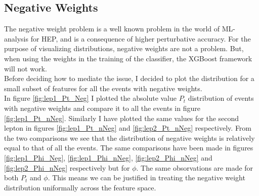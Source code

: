 \subsection{Negative Weights}
The negative weight problem is a well known problem in the world of ML-analysis for HEP, 
and is a consequence of higher perturbative accuracy. For the purpose of visualizing 
distributions, negative weights are not a problem. But, when using the weights in the 
training of the classifier, the XGBoost framework will not work. 
\\
Before deciding how to mediate the issue, I decided to plot the distribution for 
a small subset of features for all the events with negative weights.
\\
In figure \ref{fig:lep1_Pt_Neg} I plotted the absolute value $P_t$ distribution of events with
negative weights and compare it to all the events in figure \ref{fig:lep1_Pt_nNeg}. Similarly
I have plotted the same values for the second lepton in figures \ref{fig:lep1_Pt_nNeg} and \ref{fig:lep2_Pt_nNeg}
respectively. From the two comparisons we see that the distribution of negative
weights is relatively equal to that of all the events. The same comparisons have
been made in figures \ref{fig:lep1_Phi_Neg}, \ref{fig:lep1_Phi_nNeg}, \ref{fig:lep2_Phi_nNeg}  
and \ref{fig:lep2_Phi_nNeg} respectively but for $\phi$. The same obsorvations
are made for both $P_t$ and $\phi$. This means we can be justified in treating the 
negative weight distribution uniformally across the feature space.
